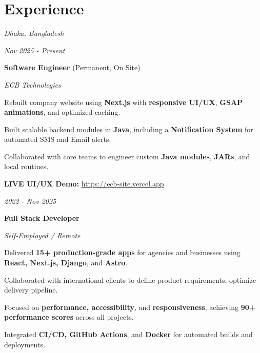 \section{Experience}
\begin{twocolentry}{
    \textit{Dhaka, Bangladesh}
        
    \textit{Nov 2025 - Present}}
        \textbf{Software Engineer} (Permanent, On Site)
        
        \textit{ECB Technologies}
    \end{twocolentry}

    \vspace{0.10 cm}
    \begin{onecolentry}
        \begin{highlights}
            \item Rebuilt company website using \textbf{Next.js} with \textbf{responsive UI/UX}, \textbf{GSAP animations}, and optimized caching.
            \item Built scalable backend modules in \textbf{Java}, including a \textbf{Notification System} for automated SMS and Email alerts.
            \item Collaborated with core teams to engineer custom \textbf{Java modules}, \textbf{JARs}, and local routines.
            \item \textbf{LIVE UI/UX Demo:} \url{https://ecb-site.vercel.app}
        \end{highlights}
    \end{onecolentry}


    \begin{twocolentry}{
        
    \textit{2022 - Nov 2025}}
        \textbf{Full Stack Developer}
        
        \textit{Self-Employed / Remote}
    \end{twocolentry}

    \vspace{0.10 cm}
    \begin{onecolentry}
        \begin{highlights}
            \item Delivered \textbf{15+ production-grade apps} for agencies and businesses using \textbf{React, Next.js, Django}, and \textbf{Astro}.
            \item Collaborated with international clients to define product requirements, optimize delivery pipeline.
            \item Focused on \textbf{performance, accessibility}, and \textbf{responsiveness}, achieving \textbf{90+ performance scores} across all projects.
            \item Integrated \textbf{CI/CD, GitHub Actions}, and \textbf{Docker} for automated builds and deployments.
        \end{highlights}
    \end{onecolentry}

